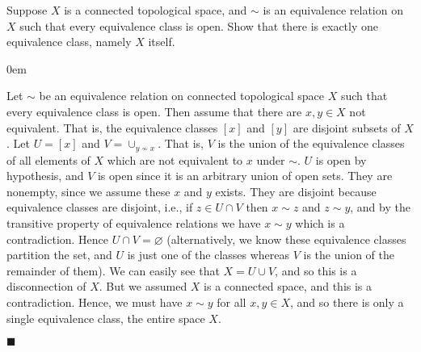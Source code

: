 \documentclass[12pt]{article}
\renewcommand{\qed}{\hfill$\blacksquare$}
\renewenvironment{proof}{\begin{addmargin}[1em]{0em}\begin{newproof}}{\end{newproof}\end{addmargin}\qed}
\newenvironment{exercise}[2][Exercise]{\begin{trivlist}
\item[\hskip \labelsep {\bfseries #1}\hskip \labelsep {\bfseries #2.}]}{\end{trivlist}}
\begin{document}
\begin{exercise}{4.3}
Suppose $X$ is a connected topological space, and $\sim$ is an equivalence relation on $X$ such that every equivalence class is open. Show that there is exactly one equivalence class, namely $X$ itself.
\end{exercise}
\begin{proof}
Let $\sim$ be an equivalence relation on connected topological space $X$ such that every equivalence class is open. Then assume that there are $x,y\in X$ not equivalent. That is, the equivalence classes $\left[x\right]$ and $\left[y\right]$ are disjoint subsets of $X$. Let $U = \left[x\right]$ and $V = \cup_{y\nsim x}$. That is, $V$ is the union of the equivalence classes of all elements of $X$ which are not equivalent to $x$ under $\sim$. $U$ is open by hypothesis, and $V$ is open since it is an arbitrary union of open sets. They are nonempty, since we assume these $x$ and $y$ exists. They are disjoint because equivalence classes are disjoint, i.e., if $z\in U\cap V$ then $x\sim z$ and $z\sim y$, and by the transitive property of equivalence relations we have $x\sim y$ which is a contradiction. Hence $U\cap V=\varnothing$ {\color{red} (alternatively, we know these equivalence classes partition the set, and $U$ is just one of the classes whereas $V$ is the union of the remainder of them).} We can easily see that $X=U\cup V$, and so this is a disconnection of $X$. But we assumed $X$ is a connected space, and this is a contradiction. Hence, we must have $x\sim y$ for all $x,y \in X$, and so there is only a single equivalence class, the entire space $X$.
\end{proof}
\end{document}
